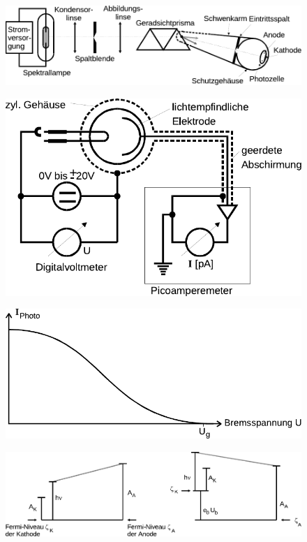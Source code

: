 \begin{figure}[H]
	\centering
	\includegraphics[width=0.8\linewidth]{content/grafik/optik.pdf}
	\caption{}
	\label{fig:optik}
\end{figure}

\begin{figure}[H]
	\centering
	\hspace{6ex}
	\includegraphics[width=0.6\linewidth]{content/grafik/schaltbild.pdf}
	\caption{}
	\label{fig:schaltbild}
\end{figure}

\begin{figure}[H]
	\centering
	\includegraphics[width=0.7\linewidth]{content/grafik/kurve.pdf}
	\caption{}
	\label{fig:kurve}
\end{figure}

\begin{figure}[H]
	\centering
	\includegraphics[width=0.9\linewidth]{content/grafik/potential.pdf}
	\caption{}
	\label{fig:potential}
\end{figure}

